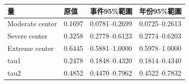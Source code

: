 \begin{tabular}{llll}
\hline
量 & 原值 & 事件95\%範圍 & 年份95\%範圍 \\
\hline
Moderate center & 0.1697 & 0.0781–0.2699 & 0.0725–0.2613 \\
Severe center & 0.3258 & 0.2778–0.6123 & 0.2774–0.6203 \\
Extreme center & 0.6445 & 0.5881–1.0000 & 0.5978–1.0000 \\
tau1 & 0.2478 & 0.1848–0.4320 & 0.1814–0.4340 \\
tau2 & 0.4852 & 0.4470–0.7962 & 0.4522–0.7832 \\
\hline
\end{tabular}